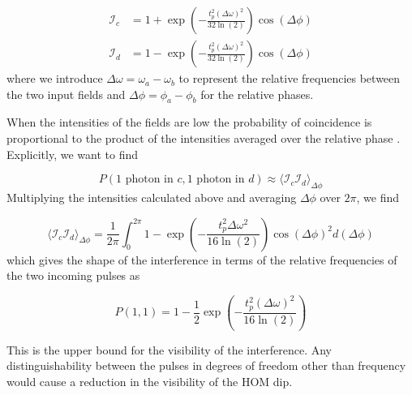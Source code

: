 \begin{align}
	\mathcal{I}_c &= 1 + \exp\left(-\frac{t_p^2(\Delta\omega)^2}{32\ln(2)}\right)\cos(\Delta\phi)\\
	\mathcal{I}_d &= 1 - \exp\left(-\frac{t_p^2(\Delta\omega)^2}{32\ln(2)}\right)\cos(\Delta\phi)
\end{align}
where we introduce $\Delta\omega = \omega_a - \omega_b$ to represent the relative frequencies between the two input fields and $\Delta\phi = \phi_a - \phi_b$ for the relative phases. 

When the intensities of the fields are low the probability of coincidence is proportional to the product of the intensities averaged over the relative phase \cite{Rarity2005}. Explicitly, we want to find

\begin{equation}
	P(\text{1 photon in } c,\text{1 photon in } d) \approx \langle \mathcal{I}_c \mathcal{I}_d\rangle_{\Delta\phi}
\end{equation}
Multiplying the intensities calculated above and averaging $\Delta\phi$ over $2\pi$, we find

\begin{equation}
	\langle \mathcal{I}_c \mathcal{I}_d\rangle_{\Delta\phi} = \frac{1}{2\pi}\int_0^{2\pi} 1 - \exp\left(-\frac{t_p^2 \Delta\omega^2}{16\ln(2)}\right)\cos(\Delta\phi)^2 d(\Delta\phi)
\end{equation} 
which gives the shape of the interference in terms of the relative frequencies of the two incoming pulses as

\begin{equation}
	P(1,1) = 1 - \frac{1}{2} \exp\left( -\frac{t_p^2(\Delta\omega)^2}{16\ln(2)} \right)
\end{equation}

This is the upper bound for the visibility of the interference. Any distinguishability between the pulses in degrees of freedom other than frequency would cause a reduction in the visibility of the \ac{HOM} dip. 


